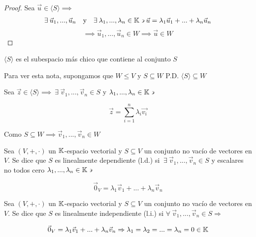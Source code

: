 \begin{proof}
    Sea $\vec{u} \in \langle S \rangle \implies$
        \begin{align*}
          \exists \: {\vec{u}}_{1}, ... ,{\vec{u}}_{n} & & \text{y} & &  \exists \: {\lambda}_{1},...,{\lambda}_{n} \in \mathbb{K} \backepsilon  \vec{u} = {\lambda}_{1}{\vec{u}}_{1} + ... + {\lambda}_{n}{\vec{u}}_{n}
        \end{align*}
        \begin{equation*}
            \implies {\vec{u}}_{1}, ... ,{\vec{u}}_{n} \in W \implies \vec{u} \in W
        \end{equation*}
\end{proof}

\begin{corollary}
    $\langle S \rangle$ es el subespacio más chico que contiene al conjunto $S$
\end{corollary}

\begin{orangeproof}
    Para ver esta nota, supongamos que $W \leq V$ y $S \subseteq W$ P.D. $\langle S \rangle \subseteq W$

    Sea $\vec{z} \in \langle S \rangle \implies \: \exists \: {\vec{v}}_{1},...,{\vec{v}}_{n} \in S$ y $\lambda_1,...,\lambda_n \in \mathbb{K} \backepsilon$

    \begin{equation*}
        \vec{z} = \sum_{i=1}^{n} \lambda_i \vec{v_i}
    \end{equation*}

    Como $S \subseteq W \implies {\vec{v}}_{1},...,{\vec{v}}_{n} \in W$
\end{orangeproof}

\begin{definition}
    Sea $(V,+,\cdot)$ un $\mathbb{K}$-espacio vectorial y $S \subseteq V$ un conjunto no vacío de vectores en $V$. Se dice que $S$ es linealmente dependiente (l.d.) si $\: \exists \: {\vec{v}}_{1},...,{\vec{v}}_{n} \in S$ y escalares no todos cero $\lambda_1,...,\lambda_n \in \mathbb{K} \backepsilon$

    \begin{equation*}
        {\vec{0}}_{V} = \lambda_1 {\vec{v}}_{1} + ... +\lambda_n {\vec{v}}_{n}
    \end{equation*}
\end{definition}

\begin{definition}
    Sea $(V,+,\cdot)$ un $\mathbb{K}$-espacio vectorial y $S \subseteq V$ un conjunto no vacío de vectores en $V$. Se dice que $S$ es linealmente independiente (l.i.) si $\forall \: {\vec{v}}_{1},...,{\vec{v}}_{n} \in S \Rightarrow$

    \begin{equation*}
        {\vec{0}}_{V} = \lambda_1 {\vec{v}}_{1} + ... +\lambda_n {\vec{v}}_{n} \Rightarrow \lambda_1 = \lambda_2 = ... = \lambda_n = 0 \in \mathbb{K}
    \end{equation*}
\end{definition}

